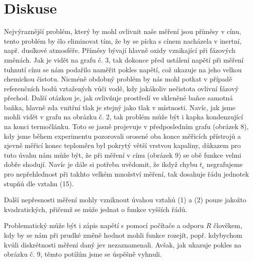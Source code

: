 \documentclass{article}
\begin{document}
\section*{Diskuse}
\par Nejvýraznější problém, který by mohl ovlivnit naše měření jsou příměsy v cínu, tento problém by šlo eliminovat tím, že by se pícka s cínem nacházela v inertní, např. dusíkové atmosféře. Příměsy bývají hlavně oxidy vznikající při fázových změnách. Jak je vidět na grafu č. 3, tak dokonce před ustálení napětí při měření tuhnutí cínu se nám podařilo naměřit pokles napětí, což ukazuje na jeho velkou chemickou čistotu. Nicméně obdobný problém by nás mohl potkat v případě referenčních bodů vztažených vůči vodě, kdy jakákoliv nečistota ovlivní fázový přechod. Další otázkou je, jak ovlivňuje prostředí ve skleněné baňce samotná baňka, hlavně zda vnitřní tlak je stejný jako tlak v místnosti. Navíc, jak jsme mohli vidět v grafu na obrázku č. 2, tak problém může být i kapka kondenzující na konci termočlánku. Toto se jasně projevuje v předposledním grafu (obrázek 8), kdy jsme během experimentu pozorovali orosené oba konce měřicích přístrojů a zjevně měřicí konec teploměru byl pokrytý větší vrstvou kapaliny, důkazem pro tuto úvahu nám může být, že při měření v cínu (obrázek 9) se obě funkce velmi dobře shodují. Navíc je dále si potřeba uvědomit, že ikdyž chybu $t_{\epsilon}$ negrafujeme pro nepřehlednost při takhto velkém množství měření, tak dosahuje řádu jednotek stupňů dle vztahu (15).
\par Další nepřesnosti měření mohly vzniknout úvahou vztahů (1) a (2) pouze jakožto kvadratických, přičemž se může jednat o funkce vyšších řádů.
\par Problematický může být i zápis napětí $\epsilon$ pomocí počítače a odporu $R$ člověkem, kdy by se nám při prudké změně hodnot mohli funkce rozejít, popř. kdybychom kvůli diskrétnosti měření daný jev nezaznamenali. Avšak, jak ukazuje pokles na obrázku č. 9, těmto potížím jsme se úspěšně vyhnuli.
\end{document}
